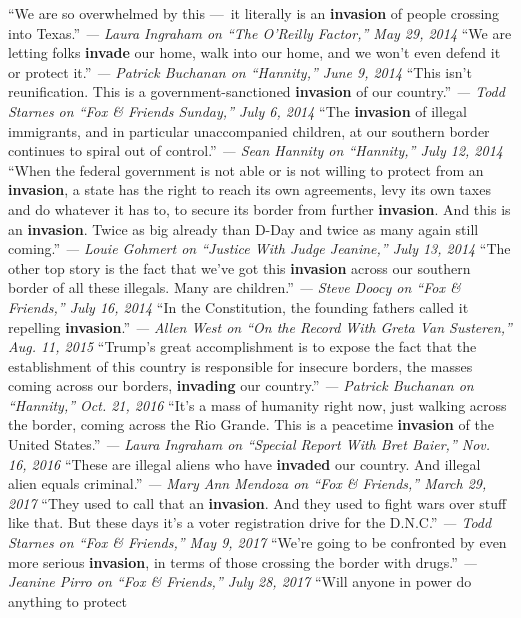  ``We are so overwhelmed by this ---~it literally is an
\textbf{invasion} of people crossing into Texas.'' \emph{--- Laura
Ingraham on ``The O'Reilly Factor,'' May 29, 2014} ``We are letting
folks \textbf{invade} our home, walk into our home, and we won't even
defend it or protect it.'' \emph{--- Patrick Buchanan on ``Hannity,''
June 9, 2014} ``This isn't reunification. This is a
government-sanctioned \textbf{invasion} of our country.'' \emph{--- Todd
Starnes on ``Fox \& Friends Sunday,'' July 6, 2014} ``The
\textbf{invasion} of illegal immigrants, and in particular unaccompanied
children, at our southern border continues to spiral out of control.''
\emph{--- Sean Hannity on ``Hannity,'' July 12, 2014} ``When the federal
government is not able or is not willing to protect from an
\textbf{invasion}, a state has the right to reach its own agreements,
levy its own taxes and do whatever it has to, to secure its border from
further \textbf{invasion}. And this is an \textbf{invasion}. Twice as
big already than D-Day and twice as many again still coming.'' \emph{---
Louie Gohmert on ``Justice With Judge Jeanine,'' July 13, 2014} ``The
other top story is the fact that we've got this \textbf{invasion} across
our southern border of all these illegals. Many are children.''
\emph{--- Steve Doocy on ``Fox \& Friends,'' July 16, 2014} ``In the
Constitution, the founding fathers called it repelling
\textbf{invasion}.'' \emph{--- Allen West on ``On the Record With Greta
Van Susteren,'' Aug. 11, 2015} ``Trump's great accomplishment is to
expose the fact that the establishment of this country is responsible
for insecure borders, the masses coming across our borders,
\textbf{invading} our country.'' \emph{--- Patrick Buchanan on
``Hannity,'' Oct. 21, 2016} ``It's a mass of humanity right now, just
walking across the border, coming across the Rio Grande. This is a
peacetime \textbf{invasion} of the United States.'' \emph{--- Laura
Ingraham on ``Special Report With Bret Baier,'' Nov. 16, 2016} ``These
are illegal aliens who have \textbf{invaded} our country. And illegal
alien equals criminal.'' \emph{--- Mary Ann Mendoza on ``Fox \&
Friends,'' March 29, 2017} ``They used to call that an
\textbf{invasion}. And they used to fight wars over stuff like that. But
these days it's a voter registration drive for the D.N.C.'' \emph{---
Todd Starnes on ``Fox \& Friends,'' May 9, 2017} ``We're going to be
confronted by even more serious \textbf{invasion}, in terms of those
crossing the border with drugs.'' \emph{--- Jeanine Pirro on ``Fox \&
Friends,'' July 28, 2017} ``Will anyone in power do anything to protect
